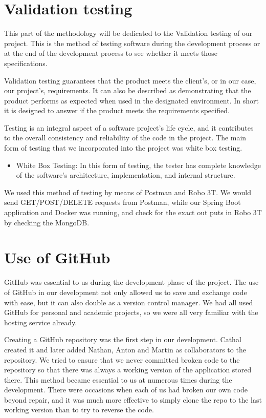 \section{Validation testing}
This part of the methodology will be dedicated to the Validation testing of our project. This is the method of testing software during the development process or at the end of the development process to see whether it meets those specifications. \par
Validation testing guarantees that the product meets the client's, or in our case, our project's, requirements. It can also be described as demonstrating that the product performs as expected when used in the designated environment. In short it is designed to answer if the product meets the requirements specified.\par
Testing is an integral aspect of a software project's life cycle, and it contributes to the overall consistency and reliability of the code in the project. The main form of testing that we incorporated into the project was white box testing. 
\begin{itemize}
    \item White Box Testing: In this form of testing, the tester has complete knowledge of the software's architecture, implementation, and internal structure. 
\end{itemize}
\par We used this method of testing by means of Postman and Robo 3T. We would send GET/POST/DELETE requests from Postman, while our Spring Boot application and Docker was running, and check for the exact out puts in Robo 3T by checking the MongoDB.

\section{Use of GitHub}
GitHub was essential to us during the development phase of the project. The use of GitHub in our development not only allowed us to save and exchange code with ease, but it can also double as a version control manager. We had all used GitHub for personal and academic projects, so we were all very familiar with the hosting service already. \par
Creating a GitHub repository was the first step in our development. Cathal created it and later added Nathan, Anton and Martin as collaborators to the repository. We tried to ensure that we never committed broken code to the repository so that there was always a working version of the application stored there. This method became essential to us at numerous times during the development. There were occasions when each of us had broken our own code beyond repair, and it was much more effective to simply clone the repo to the last working version than to try to reverse the code. 

